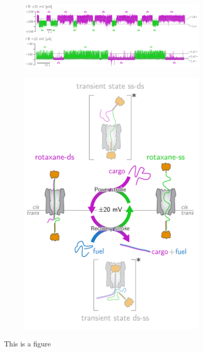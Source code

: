 \begin{figure}[ht]
  \begin{centering}
  \begin{subfigure}[t]{\dimexpr.95\linewidth-1.3em\relax}
  \centering
  \includegraphics[width=\linewidth,valign=t]{Figures/FluctuationRotaxane.png}
  \end{subfigure}%
  \vspace{0.5cm}
  \begin{subfigure}[t]{\dimexpr.5\linewidth-1.3em\relax}
  \centering
  \includegraphics[width=\linewidth,valign=t]{Figures/RotaxaneCycle.png}
  \end{subfigure}
  \caption{This is a figure}
  \label{fig:test}
  \end{centering}
\end{figure}
